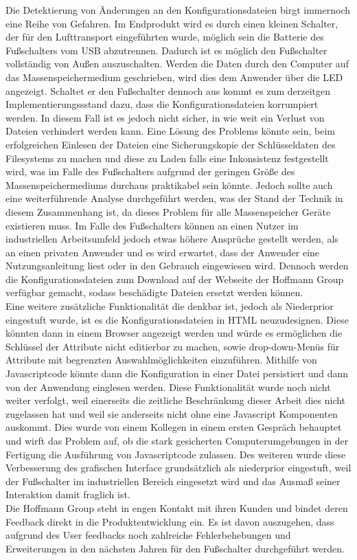 Die Detektierung von Änderungen an den Konfigurationsdateien birgt immernoch eine Reihe von Gefahren. Im Endprodukt wird es durch einen kleinen Schalter, der für den Lufttransport eingeführten wurde, möglich sein die Batterie des Fußschalters vom USB abzutrennen. Dadurch ist es möglich den Fußschalter vollständig von Außen auszuschalten. Werden die Daten durch den Computer auf das Massenspeichermedium geschrieben, wird dies dem Anwender über die LED angezeigt. Schaltet er den Fußschalter dennoch aus kommt es zum derzeitgen Implementierungssstand dazu, dass die Konfigurationsdateien korrumpiert werden. In diesem Fall ist es jedoch nicht sicher, in wie weit ein Verlust von Dateien verhindert werden kann. Eine Lösung des Problems könnte sein, beim erfolgreichen Einlesen der Dateien eine Sicherungskopie der Schlüsseldaten des Filesystems zu machen und diese zu Laden falls eine Inkonsistenz festgestellt wird, was im Falle des Fußschalters aufgrund der geringen Größe des Massenspeichermediums durchaus praktikabel sein könnte. Jedoch sollte auch eine weiterführende Analyse durchgeführt werden, was der Stand der Technik in diesem Zusammenhang ist, da dieses Problem für alle Massenspeicher Geräte existieren muss. Im Falle des Fußschalters können an einen Nutzer im industriellen Arbeitsumfeld jedoch etwas höhere Ansprüche gestellt werden, als an einen privaten Anwender und es wird erwartet, dass der Anwender eine Nutzungsanleitung liest oder in den Gebrauch eingewiesen wird. Dennoch werden die Konfigurationsdateien zum Download auf der Webseite der Hoffmann Group verfügbar gemacht, sodass beschädigte Dateien ersetzt werden können.\\
Eine weitere zusätzliche Funktionalität die denkbar ist, jedoch als Niederprior eingestuft wurde, ist es die Konfigurationsdateien in \ac{HTML} neuzudesignen. Diese könnten dann in einem Browser angezeigt werden und würde es ermöglichen die Schlüssel der Attribute nicht editierbar zu machen, sowie drop-down-Menüs für Attribute mit begrenzten Auswahlmöglichkeiten einzuführen. Mithilfe von Javascriptcode könnte dann die Konfiguration in einer Datei persistiert und dann von der Anwendung einglesen werden. Diese Funktionalität wurde noch nicht weiter verfolgt, weil einerseits die zeitliche Beschränkung dieser Arbeit dies nicht zugelassen hat und weil sie anderseits nicht ohne eine Javascript Komponenten auskommt. Dies wurde von einem Kollegen in einem ersten Gespräch behauptet und wirft das Problem auf, ob die stark gesicherten Computerumgebungen in der Fertigung die Ausführung von Javascriptcode zulassen. Des weiteren wurde diese Verbesserung des grafischen Interface grundsätzlich als niederprior eingestuft, weil der Fußschalter im industriellen Bereich eingesetzt wird und das Ausmaß seiner Interaktion damit fraglich ist.\\
Die Hoffmann Group steht in engen Kontakt mit ihren Kunden und bindet deren Feedback direkt in die Produktentwicklung ein. Es ist davon auszugehen, dass aufgrund des User feedbacks noch zahlreiche Fehlerbehebungen und Erweiterungen in den nächsten Jahren für den Fußschalter durchgeführt werden.